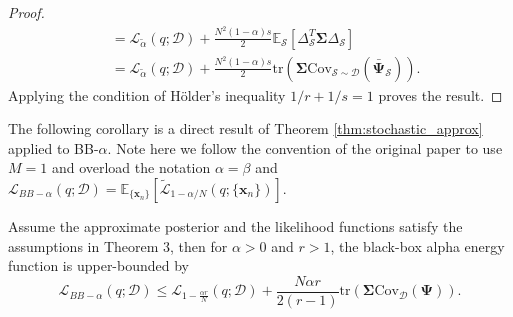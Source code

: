\begin{proof}
\begin{equation*}
\begin{aligned}
	&= \mathcal{L}_{\tilde{\alpha}}(q; \mathcal{D}) + \frac{N^2(1-\alpha) s}{2} \mathbb{E}_{\mathcal{S}} [\Delta_{\mathcal{S}}^T \bm{\Sigma} \Delta_{\mathcal{S}} ] \\
	&= \mathcal{L}_{\tilde{\alpha}}(q; \mathcal{D}) + \frac{N^2(1-\alpha) s}{2} \mathrm{tr}(\bm{\Sigma} \mathrm{Cov}_{\mathcal{S} \sim \mathcal{D}}( \bar{\bm{\Psi}}_{\mathcal{S}})).
\end{aligned}
\end{equation*}
Applying the condition of H{\"o}lder's inequality $1/r + 1/s = 1$ proves the result.
\end{proof}

The following corollary is a direct result of Theorem \ref{thm:stochastic_approx} applied to BB-$\alpha$. Note here we follow the convention of the original paper \cite{hernandez-lobato:bb-alpha} to use $M = 1$ and overload the notation $\alpha = \beta$ and $\mathcal{L}_{BB-\alpha}(q; \mathcal{D}) = \mathbb{E}_{\{  \bm{x}_n\}} \left[ \tilde{\mathcal{L}}_{1 - \alpha/N}(q; \{ \bm{x}_n \}) \right]$.
\begin{corollary}
Assume the approximate posterior and the likelihood functions satisfy the assumptions in Theorem 3, then for $\alpha > 0$ and $r > 1$, the black-box alpha energy function is upper-bounded by
\begin{equation*}
\mathcal{L}_{BB-\alpha}(q; \mathcal{D}) \leq \mathcal{L}_{1 - \frac{\alpha r}{N}}(q; \mathcal{D}) + \frac{N \alpha r}{2(r - 1)}  \mathrm{tr}(\bm{\Sigma} \mathrm{Cov}_{\mathcal{D}}(\bm{\Psi})).
\end{equation*}
\end{corollary} 
